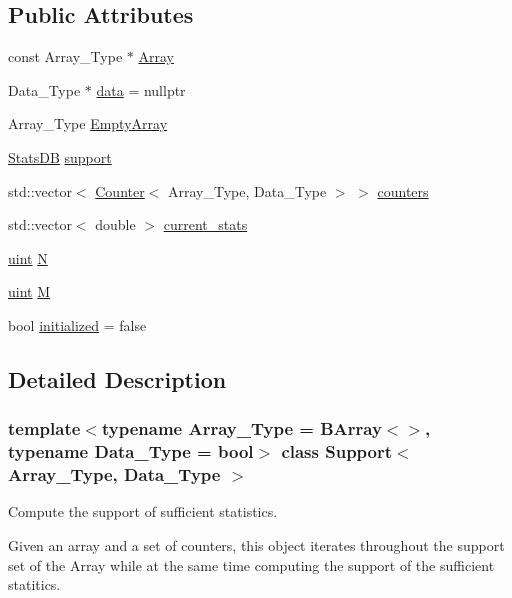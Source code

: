 \subsection*{Public Attributes}
\begin{DoxyCompactItemize}
\item 
const Array\+\_\+\+Type $\ast$ \hyperlink{class_support_a73f1375ad76be291f9f3768e9d6f912c}{Array}
\item 
Data\+\_\+\+Type $\ast$ \hyperlink{class_support_ad185d111ea5ea3bfe16cf458a36efc63}{data} = nullptr
\item 
Array\+\_\+\+Type \hyperlink{class_support_a9364028f9966697e3cdd3fc6a5cd90de}{Empty\+Array}
\item 
\hyperlink{class_stats_d_b}{Stats\+DB} \hyperlink{class_support_ab2f404c7c11d5bc58e876124cc52d073}{support}
\item 
std\+::vector$<$ \hyperlink{class_counter}{Counter}$<$ Array\+\_\+\+Type, Data\+\_\+\+Type $>$ $>$ \hyperlink{class_support_a04c684d0e662d58aad1c90b9c0a595b5}{counters}
\item 
std\+::vector$<$ double $>$ \hyperlink{class_support_ada67557033378742f8592a96f39d1127}{current\+\_\+stats}
\item 
\hyperlink{typedefs_8hpp_a91ad9478d81a7aaf2593e8d9c3d06a14}{uint} \hyperlink{class_support_ab15c7125d6b99ae15ec4dbb34c9ce9b6}{N}
\item 
\hyperlink{typedefs_8hpp_a91ad9478d81a7aaf2593e8d9c3d06a14}{uint} \hyperlink{class_support_ace1d46b871c67caa774ac2269930e97f}{M}
\item 
bool \hyperlink{class_support_ac352c6473720fcdcd9895c48bd872ef5}{initialized} = false
\end{DoxyCompactItemize}


\subsection{Detailed Description}
\subsubsection*{template$<$typename Array\+\_\+\+Type = B\+Array$<$$>$, typename Data\+\_\+\+Type = bool$>$\newline
class Support$<$ Array\+\_\+\+Type, Data\+\_\+\+Type $>$}

Compute the support of sufficient statistics. 

Given an array and a set of counters, this object iterates throughout the support set of the Array while at the same time computing the support of the sufficient statitics. 

